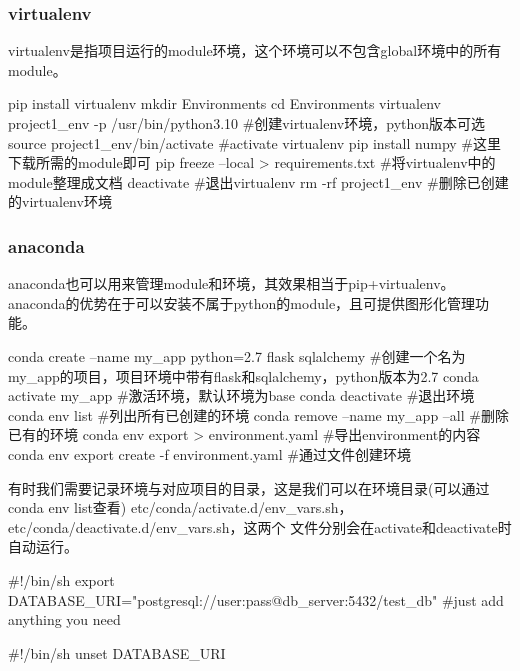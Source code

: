 \documentclass{article}
\begin{document}
      \subsubsection{virtualenv}
        virtualenv是指项目运行的module环境，这个环境可以不包含global环境中的所有module。
        \begin{codeblock}[language=bash, caption={setup virtualenv}]
          pip install virtualenv 
          mkdir Environments
          cd Environments
          virtualenv project1_env -p /usr/bin/python3.10 #创建virtualenv环境，python版本可选
          source project1_env/bin/activate #activate virtualenv
          pip install numpy #这里下载所需的module即可
          pip freeze --local > requirements.txt #将virtualenv中的module整理成文档
          deactivate #退出virtualenv
          rm -rf project1_env #删除已创建的virtualenv环境
        \end{codeblock}

      \subsubsection{anaconda}
        anaconda也可以用来管理module和环境，其效果相当于pip+virtualenv。
        anaconda的优势在于可以安装不属于python的module，且可提供图形化管理功能。
        \begin{codeblock}[language=bash, caption={anaconda}]
          conda create --name my_app python=2.7 flask sqlalchemy
          #创建一个名为my\_app的项目，项目环境中带有flask和sqlalchemy，python版本为2.7
          conda activate my_app #激活环境，默认环境为base
          conda deactivate #退出环境
          conda env list #列出所有已创建的环境 
          conda remove --name my_app --all #删除已有的环境
          conda env export > environment.yaml #导出environment的内容
          conda env export create -f environment.yaml #通过文件创建环境
        \end{codeblock}

        有时我们需要记录环境与对应项目的目录，这是我们可以在环境目录(可以通过conda env list查看)
        etc/conda/activate.d/env\_vars.sh，etc/conda/deactivate.d/env\_vars.sh，这两个
        文件分别会在activate和deactivate时自动运行。
        \begin{codeblock}[language=bash, caption={activate.d/env\_vars.sh}]
          #!/bin/sh
          export DATABASE_URI="postgresql://user:pass@db_server:5432/test_db"
          #just add anything you need
        \end{codeblock}
        \begin{codeblock}[language=bash, caption={deactivate.d/env\_vars.sh}]
          #!/bin/sh
          unset DATABASE_URI
        \end{codeblock}
\end{document}
